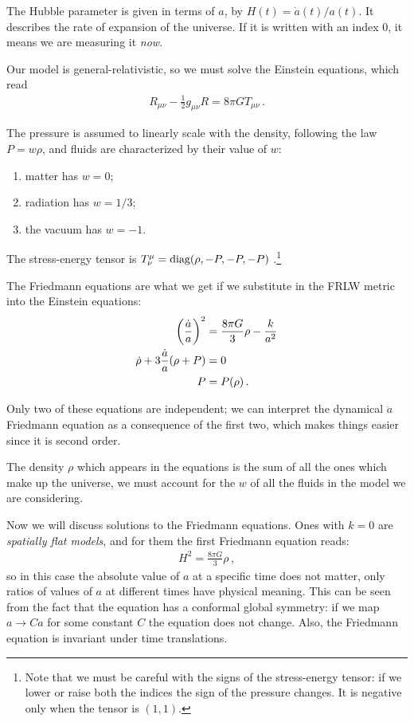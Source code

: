 \documentclass[main.tex]{subfiles}
\begin{document}
The Hubble parameter is given in terms of \(a\), by \(H(t) = \dot{a}(t) / a(t)\). It describes the rate of expansion of the universe.
If it is written with an index \(0\), it means we are measuring it \emph{now}. 

Our model is general-relativistic, so we must solve the Einstein equations, which read 
%
\begin{align}
R_{\mu \nu } - \frac{1}{2} g_{\mu \nu } R= 8 \pi G T_{\mu \nu }
\,.
\end{align}

The pressure is assumed to linearly scale with the density, following the law \(P = w \rho \), and fluids are characterized by their value of \(w\): 
\begin{enumerate}
    \item matter has \(w = 0\);
    \item radiation has \(w = 1/3\);
    \item the vacuum has \(w = -1\).
\end{enumerate}

The stress-energy tensor is \(T^{\mu}_{ \nu } = \text{diag}\qty(\rho, -P, -P, -P)\) \cite[eq.\ 3.4]{kolbEarlyUniverse1994}.\footnote{Note that we must be careful with the signs of the stress-energy tensor: if we lower or raise both the indices the sign of the pressure changes. It is negative only when the tensor is \((1, 1)\).}

The Friedmann equations are what we get if we substitute in the FRLW metric into the Einstein equations: 
%
\begin{subequations}
\begin{align}
\qty( \frac{\dot{a}}{a})^2 &= \frac{8 \pi G}{3} \rho - \frac{k}{a^2}  \\
\dot{\rho} + 3 \frac{\dot{a}}{a}(\rho + P) &=0  \\
P &= P(\rho ) 
\,.
\end{align}
\end{subequations}

Only two of these equations are independent; 
we can interpret the dynamical \(\ddot{a}\) Friedmann equation as a consequence of the first two, which makes things easier since it is second order. 

The density \(\rho \) which appears in the equations is the sum of all the ones which make up the universe, we must account for the \(w\) of all the fluids in the model we are considering. 

Now we will discuss solutions to the Friedmann equations. Ones with \(k = 0\) are \emph{spatially flat models}, and for them the first Friedmann equation reads: 
%
\begin{align}
H^2 = \frac{8 \pi G}{3} \rho 
\,,
\end{align}
%
so in this case the absolute value of \(a\) at a specific time does not matter, only ratios of values of \(a\) at different times have physical meaning.
This can be seen from the fact that the equation has a conformal global symmetry: if we map \(a \to C a\) for some constant \(C\) the equation does not change. 
Also, the Friedmann equation is invariant under time translations. 
\end{document}

